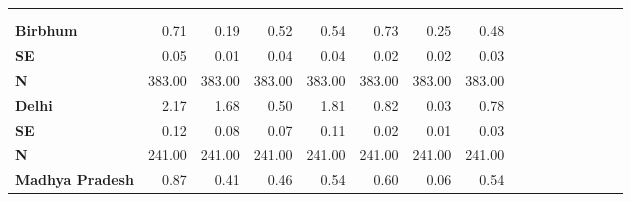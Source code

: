 \begin{tabular}{@{\extracolsep{5pt}}lrrrrrrrrrrrrrrr}
\toprule
&  &  &  &  &  &  &  \\
{\bf } &  &  &  &  &  &  &  \\
\hline
{\bf Birbhum} & 0.71\phantom{***} & 0.19\phantom{***} & 0.52\phantom{***} & 0.54\phantom{***} & 0.73\phantom{***} & 0.25\phantom{***} & 0.48\phantom{***} \\
{\bf SE} & 0.05\phantom{***} & 0.01\phantom{***} & 0.04\phantom{***} & 0.04\phantom{***} & 0.02\phantom{***} & 0.02\phantom{***} & 0.03\phantom{***} \\
{\bf N} & 383.00\phantom{***} & 383.00\phantom{***} & 383.00\phantom{***} & 383.00\phantom{***} & 383.00\phantom{***} & 383.00\phantom{***} & 383.00\phantom{***} \\
{\bf Delhi} & 2.17\phantom{***} & 1.68\phantom{***} & 0.50\phantom{***} & 1.81\phantom{***} & 0.82\phantom{***} & 0.03\phantom{***} & 0.78\phantom{***} \\
{\bf SE} & 0.12\phantom{***} & 0.08\phantom{***} & 0.07\phantom{***} & 0.11\phantom{***} & 0.02\phantom{***} & 0.01\phantom{***} & 0.03\phantom{***} \\
{\bf N} & 241.00\phantom{***} & 241.00\phantom{***} & 241.00\phantom{***} & 241.00\phantom{***} & 241.00\phantom{***} & 241.00\phantom{***} & 241.00\phantom{***} \\
{\bf Madhya Pradesh} & 0.87\phantom{***} & 0.41\phantom{***} & 0.46\phantom{***} & 0.54\phantom{***} & 0.60\phantom{***} & 0.06\phantom{***} & 0.54\phantom{***} \\

\end{tabular}
